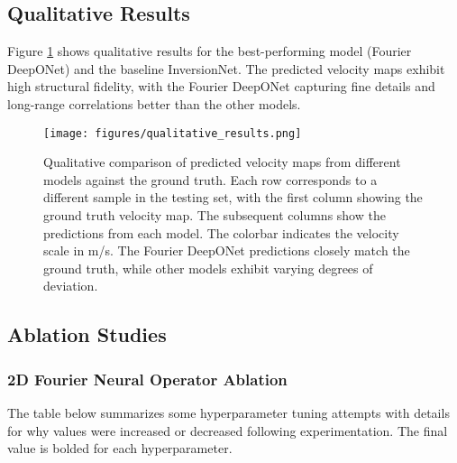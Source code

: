 \documentclass{article}
\begin{document}
\subsection{Qualitative Results}

Figure \ref{fig:qualitative_results} shows qualitative results for the best-performing model (Fourier DeepONet) and the baseline InversionNet. The predicted velocity maps exhibit high structural fidelity, with the Fourier DeepONet capturing fine details and long-range correlations better than the other models.

\begin{figure}
    \centering
    \texttt{[image: figures/qualitative\_results.png]}
    \caption{Qualitative comparison of predicted velocity maps from different models against the ground truth. Each row corresponds to a different sample in the testing set, with the first column showing the ground truth velocity map. The subsequent columns show the predictions from each model. The colorbar indicates the velocity scale in m/s. The Fourier DeepONet predictions closely match the ground truth, while other models exhibit varying degrees of deviation.}
    \label{fig:qualitative_results}
\end{figure}

\subsection{Ablation Studies}

\subsubsection{2D Fourier Neural Operator Ablation}

The table below summarizes some hyperparameter tuning attempts with details for why values were increased or decreased following experimentation. The final value is bolded for each hyperparameter.
\end{document}
